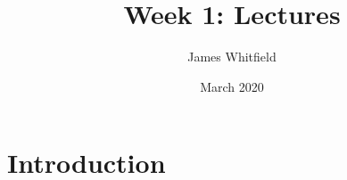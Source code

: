 \documentclass{article}
\title{Week 1: Lectures}
\author{James Whitfield}
\date{March 2020}
\begin{document}
\maketitle

\section{Introduction}
\end{document}
